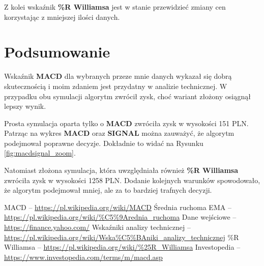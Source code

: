 \documentclass{article}
\begin{document}
    Z kolei wskaźnik \textbf{\%R Williamsa} jest w stanie przewidzieć zmiany cen
    korzystając z mniejszej ilości danych.

    \section{Podsumowanie}
    Wskaźnik \textbf{MACD} dla wybranych przeze mnie danych wykazał się dobrą skutecznością i moim
    zdaniem jest przydatny w analizie technicznej.
    W przypadku obu symulacji algorytm zwrócił zysk, choć wariant złożony osiągnął lepszy wynik.

    Prosta symulacja oparta tylko o \textbf{MACD} zwróciła zysk w wysokości 151 PLN.
    Patrząc na wykres \textbf{MACD} oraz \textbf{SIGNAL} można zauważyć, że algorytm
    podejmował poprawne decyzje. Dokładnie to widać na Rysunku \ref{fig:macdsignal_zoom}.

    Natomiast złożona symulacja, która uwzględniała również \textbf{\%R Williamsa} 
    zwróciła zysk w wysokości 1258 PLN. Dodanie kolejnych warunków spowodowało, że
    algorytm podejmował mniej, ale za to bardziej trafnych decyzji.

    \renewcommand{\refname}{Źródła}
    \begin{thebibliography}{100}
      MACD -- \url{https://pl.wikipedia.org/wiki/MACD}
      Średnia ruchoma EMA -- \url{https://pl.wikipedia.org/wiki/%C5%9Arednia_ruchoma}
     Dane wejściowe -- \url{https://finance.yahoo.com/}
     Wskaźniki analizy technicznej -- \url{https://pl.wikipedia.org/wiki/Wska%C5%BAniki_analizy_technicznej}
     \%R Williamsa -- \url{https://pl.wikipedia.org/wiki/%25R_Williamsa}
    \bibitem{} Investopedia -- \url{https://www.investopedia.com/terms/m/macd.asp}
    \end{thebibliography}
\end{document}
